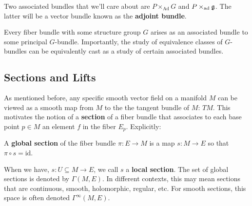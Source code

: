 		
%
		
		Two associated bundles that we'll care about are $P \times_{\mathrm{Ad}} G$ and $P \times_{\mathrm{ad}} \frak g$. The latter will be a vector bundle known as the \textbf{adjoint bundle}.
		
		Every fiber bundle with some structure group $G$ arises as an associated bundle to some principal $G$-bundle.
		Importantly, the study of equivalence classes of $G$-bundles can be equivalently cast as a study of certain associated bundles. 
		
		\subsection{Sections and Lifts}
		
		As mentioned before, any specific smooth vector field on a manifold $M$ can be viewed as a smooth map from $M$ to the the tangent bundle of $M$: $TM$. This motivates the notion of a \textbf{section} of a fiber bundle that associates to each base point $p\in M$ an element $f$ in the fiber $E_p$. Explicitly:
		\begin{defn}
			A \textbf{global section} of the fiber bundle $\pi: E \rightarrow M$ is a map $s: M \rightarrow E$ so that $\pi \circ s = \text{id}$. 
			
			When we have, $s: U \subseteq M \rightarrow E$, we call $s$ a \textbf{local section}. The set of global sections is denoted by $\Gamma(M, E)$. In different contexts, this may mean sections that are continuous, smooth, holomorphic, regular, etc. For smooth sections, this space is often denoted $\Gamma^\infty(M,E)$.
		\end{defn}
		
